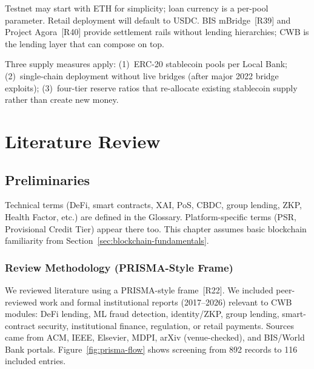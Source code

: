 \documentclass[12pt,a4paper]{report}
\begin{document}
Testnet may start with ETH for simplicity; loan currency is a per-pool parameter. Retail deployment will default to USDC. BIS mBridge~[R39] and Project Agora~[R40] provide settlement rails without lending hierarchies; CWB is the lending layer that can compose on top.

Three supply measures apply: (1)~ERC-20 stablecoin pools per Local Bank; (2)~single-chain deployment without live bridges (after major 2022 bridge exploits); (3)~four-tier reserve ratios that re-allocate existing stablecoin supply rather than create new money.


\chapter{Literature Review}

\section{Preliminaries}

Technical terms (DeFi, smart contracts, XAI, PoS, CBDC, group lending, ZKP, Health Factor, etc.) are defined in the Glossary. Platform-specific terms (PSR, Provisional Credit Tier) appear there too. This chapter assumes basic blockchain familiarity from Section~\ref{sec:blockchain-fundamentals}.

\subsection{Review Methodology (PRISMA-Style Frame)}
\label{sec:lit-prisma}

We reviewed literature using a PRISMA-style frame~[R22]. We included peer-reviewed work and formal institutional reports (2017--2026) relevant to CWB modules: DeFi lending, ML fraud detection, identity/ZKP, group lending, smart-contract security, institutional finance, regulation, or retail payments. Sources came from ACM, IEEE, Elsevier, MDPI, arXiv (venue-checked), and BIS/World Bank portals. Figure~\ref{fig:prisma-flow} shows screening from 892 records to 116 included entries.
\end{document}

